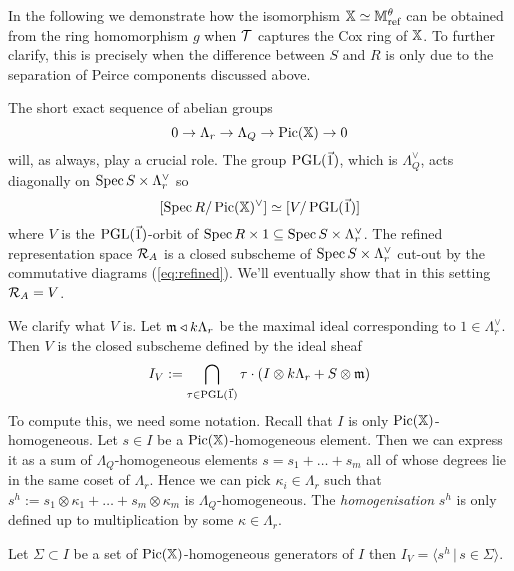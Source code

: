 \documentclass[12pt]{amsart}
\begin{document}
In the following we demonstrate how the isomorphism $\mathbb{X} \simeq \mathbb{M}_{\text{ref}}^\theta$ can be obtained from the ring homomorphism $g$ when $\mathcal{T}$ captures the Cox ring of $\mathbb{X}$.
To further clarify, this is precisely when the difference between $S$ and $R$ is only due to the separation of Peirce components discussed above.

The short exact sequence of abelian groups
\begin{equation} \label{eq:defineF}
     0 \to \Lambda_r \to \Lambda_Q \to \operatorname{Pic}(\mathbb{X}) \to 0
\end{equation}
will, as always, play a crucial role.
The group $\operatorname{PGL}(\vec{1})$, which is $\Lambda_Q^\vee$, acts diagonally on $\operatorname{Spec} S \times \Lambda_r^\vee$ so $$[\operatorname{Spec} R/\operatorname{Pic}(\mathbb{X})^\vee] \simeq [V/\operatorname{PGL}(\vec{1})]$$ where $V$ is the $\operatorname{PGL}(\vec{1})$-orbit of $\operatorname{Spec} R \times 1 \subseteq \operatorname{Spec} S \times \Lambda_r^\vee$.
The refined representation space $\mathcal{R}_A$ is a closed subscheme of $\operatorname{Spec} S \times \Lambda_r^\vee$ cut-out by the commutative diagrams (\ref{eq:refined}).
We'll eventually show that in this setting $\mathcal{R}_A = V$.

We clarify what $V$ is. 
Let $\mathfrak{m}\triangleleft k\Lambda_r$ be the maximal ideal corresponding to $1 \in \Lambda_r^\vee$. 
Then $V$ is the closed subscheme defined by the ideal sheaf
$$ I_V := \bigcap_{\tau \in \operatorname{PGL}(\vec{1})} \tau\cdot\left(I \otimes k\Lambda_r + S \otimes \mathfrak{m} \right)$$
To compute this, we need some notation. 
Recall that $I$ is only $\operatorname{Pic}(\mathbb{X})$-homogeneous. Let $s \in I$ be a $\operatorname{Pic}(\mathbb{X})$-homogeneous element. 
Then we can express it as a sum of $\Lambda_Q$-homogeneous elements $s = s_1 + \ldots + s_m$ all of whose degrees lie in the same coset of $\Lambda_r$. 
Hence we can pick $\kappa_i \in \Lambda_r$ such that $s^h := s_1 \otimes \kappa_1 + \ldots + s_m \otimes \kappa_m$ is $\Lambda_Q$-homogeneous. 
The {\em homogenisation} $s^h$ is only defined up to multiplication by some $\kappa \in \Lambda_r$. 

\begin{lemma}
Let $\Sigma \subset I$ be a set of $\operatorname{Pic}(\mathbb{X})$-homogeneous generators of $I$ then $I_V = \langle s^h \,|\, s \in \Sigma \rangle.$ 
\end{lemma}
\end{document}
